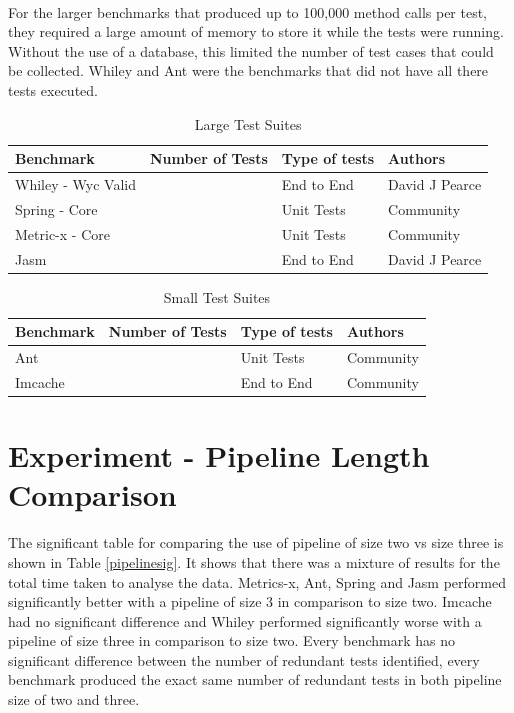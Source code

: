 \paragraph{}
For the larger benchmarks that produced up to 100,000 method calls per test, they required a large amount of memory to store it while the tests were running. Without the use of a database, this limited the number of test cases that could be collected. Whiley and Ant were the benchmarks that did not have all there tests executed.  

\begin{table}[]
\centering
\caption{Large Test Suites}
\label{large_test}
\begin{tabular}{|l|l|l|l|}
\hline
{\bf Benchmark}       &  {\bf Number of Tests} & {\bf Type of tests} & {\bf Authors}   \\ \hline
Whiley - Wyc Valid         &       &    End to End      & David J Pearce          \\ \hline
Spring - Core   &       &    Unit Tests      & Community \\ \hline
Metric-x - Core &       &    Unit Tests      & Community \\ \hline
Jasm              &             &    End to End      & David J Pearce \\ \hline

\end{tabular}
\end{table}

\begin{table}[]
\centering

\label{small_test}
\caption{Small Test Suites}
\begin{tabular}{|l|l|l|l|}
\hline
{\bf Benchmark}   & {\bf Number of Tests} & {\bf Type of tests} & {\bf Authors}  \\ \hline
Ant             &       &    Unit Tests      & Community \\ \hline
Imcache &           &    End to End        & Community \\ \hline
\end{tabular}
\end{table}

\section{Experiment  - Pipeline Length Comparison}
\label{sec:pipelineEva}
The significant table for comparing the use of pipeline of size two vs size three is shown in Table \ref{pipelinesig}. It shows that there was a mixture of results for the total time taken to analyse the data. Metrics-x, Ant, Spring and Jasm performed significantly better with a pipeline of size 3 in comparison to size two. Imcache had no significant difference and Whiley performed significantly worse with a pipeline of size three in comparison to size two. Every benchmark has no significant difference between the number of redundant tests identified, every benchmark produced the exact same number of redundant tests in both pipeline size of two and three.
